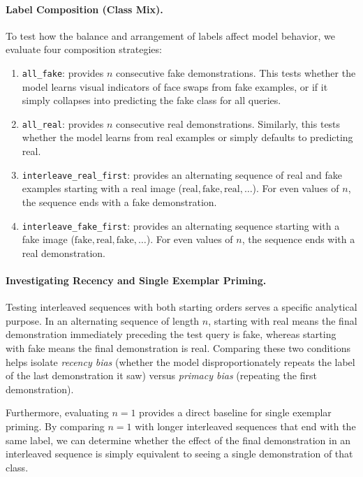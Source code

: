 \paragraph{Label Composition (Class Mix).}
To test how the balance and arrangement of labels affect model behavior, we evaluate four composition strategies:
\begin{enumerate}
    \item \texttt{all\_fake}: provides $n$ consecutive fake demonstrations. This tests whether the model learns visual indicators of face swaps from fake examples, or if it simply collapses into predicting the fake class for all queries.
    \item \texttt{all\_real}: provides $n$ consecutive real demonstrations. Similarly, this tests whether the model learns from real examples or simply defaults to predicting real.
    \item \texttt{interleave\_real\_first}: provides an alternating sequence of real and fake examples starting with a real image ($\text{real}, \text{fake}, \text{real}, \dots$). For even values of $n$, the sequence ends with a fake demonstration.
    \item \texttt{interleave\_fake\_first}: provides an alternating sequence starting with a fake image ($\text{fake}, \text{real}, \text{fake}, \dots$). For even values of $n$, the sequence ends with a real demonstration.
\end{enumerate}

\paragraph{Investigating Recency and Single Exemplar Priming.}
Testing interleaved sequences with both starting orders serves a specific analytical purpose. In an alternating sequence of length $n$, starting with real means the final demonstration immediately preceding the test query is fake, whereas starting with fake means the final demonstration is real. Comparing these two conditions helps isolate \emph{recency bias} (whether the model disproportionately repeats the label of the last demonstration it saw) versus \emph{primacy bias} (repeating the first demonstration).

Furthermore, evaluating $n = 1$ provides a direct baseline for single exemplar priming. By comparing $n = 1$ with longer interleaved sequences that end with the same label, we can determine whether the effect of the final demonstration in an interleaved sequence is simply equivalent to seeing a single demonstration of that class.

